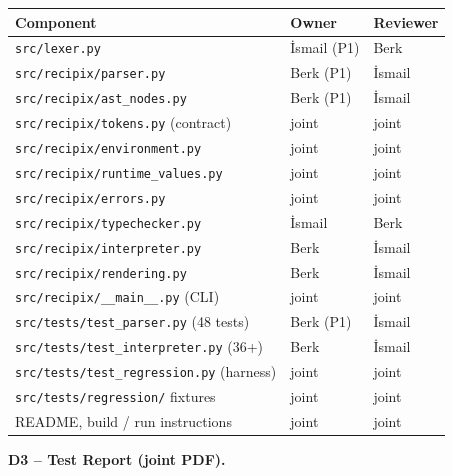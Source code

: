 \documentclass[11pt,a4paper]{article}
\begin{document}
\begin{center}
\small
\begin{tabular}{@{}p{}p{}p{}@{}}
\toprule
\textbf{Component} & \textbf{Owner} & \textbf{Reviewer} \\
\midrule
\texttt{src/lexer.py}                            & İsmail (P1)       & Berk   \\
\texttt{src/recipix/parser.py}                   & Berk (P1)         & İsmail \\
\texttt{src/recipix/ast\_nodes.py}               & Berk (P1)         & İsmail \\
\texttt{src/recipix/tokens.py} (contract)        & joint             & joint  \\
\texttt{src/recipix/environment.py}              & joint             & joint  \\
\texttt{src/recipix/runtime\_values.py}          & joint             & joint  \\
\texttt{src/recipix/errors.py}                   & joint             & joint  \\
\texttt{src/recipix/typechecker.py}              & İsmail            & Berk   \\
\texttt{src/recipix/interpreter.py}              & Berk              & İsmail \\
\texttt{src/recipix/rendering.py}                & Berk              & İsmail \\
\texttt{src/recipix/\_\_main\_\_.py} (CLI)       & joint             & joint  \\
\texttt{src/tests/test\_parser.py} (48 tests)    & Berk (P1)         & İsmail \\
\texttt{src/tests/test\_interpreter.py} (36+)    & Berk              & İsmail \\
\texttt{src/tests/test\_regression.py} (harness) & joint             & joint  \\
\texttt{src/tests/regression/} fixtures          & joint             & joint  \\
README, build / run instructions                 & joint             & joint  \\
\bottomrule
\end{tabular}
\end{center}

\noindent\textbf{D3 -- Test Report (joint PDF).}
\end{document}
